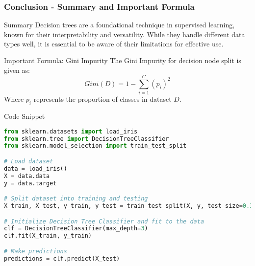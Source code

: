 \documentclass[aspectratio=169]{beamer}
\begin{document}
\begin{frame}[fragile]
  \frametitle{Conclusion - Summary and Important Formula}
  \begin{block}{Summary}
    Decision trees are a foundational technique in supervised learning, known for their interpretability and versatility. While they handle different data types well, it is essential to be aware of their limitations for effective use.
  \end{block}

  \begin{block}{Important Formula: Gini Impurity}
    The Gini Impurity for decision node split is given as:
    \begin{equation}
      Gini(D) = 1 - \sum_{i=1}^{C} (p_i)^2
    \end{equation}
    Where $p_i$ represents the proportion of classes in dataset $D$.
  \end{block}
  
  \begin{block}{Code Snippet}
    \begin{lstlisting}[language=Python]
from sklearn.datasets import load_iris
from sklearn.tree import DecisionTreeClassifier
from sklearn.model_selection import train_test_split

# Load dataset
data = load_iris()
X = data.data
y = data.target

# Split dataset into training and testing
X_train, X_test, y_train, y_test = train_test_split(X, y, test_size=0.3, random_state=42)

# Initialize Decision Tree Classifier and fit to the data
clf = DecisionTreeClassifier(max_depth=3)
clf.fit(X_train, y_train)

# Make predictions
predictions = clf.predict(X_test)
    \end{lstlisting}
  \end{block}
\end{frame}
\end{document}
